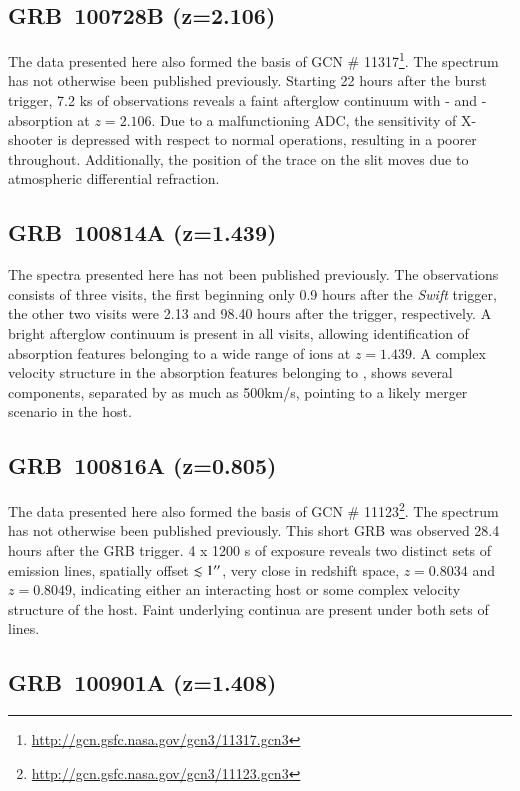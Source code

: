 \documentclass{aa}    %
\begin{document}
\subsection{GRB~100728B (z=2.106)}

The data presented here also formed the basis of GCN \#
11317\footnote{\url{http://gcn.gsfc.nasa.gov/gcn3/11317.gcn3}}. The spectrum has
not otherwise been published previously. Starting 22 hours after the burst
trigger, 7.2 ks of observations reveals a faint afterglow continuum with \lya-
and \mgii-absorption at $z=2.106$. Due to a malfunctioning ADC, the sensitivity
of X-shooter is depressed with respect to normal operations, resulting in a
poorer throughout. Additionally, the position of the trace on the slit moves due
to atmospheric differential refraction.

\subsection{GRB~100814A (z=1.439)}

The spectra presented here has not been published previously. The observations
consists of three visits, the first beginning only 0.9 hours after the
\textit{Swift} trigger, the other two visits were 2.13 and 98.40 hours after the
trigger, respectively. A bright afterglow continuum is present in all visits,
allowing identification of absorption features belonging to a wide range of ions
at $z=1.439$. A complex velocity structure in the absorption features belonging
to \mgii, shows several components, separated by as much as 500km/s, pointing to
a likely merger scenario in the host.

\subsection{GRB~100816A (z=0.805)}

The data presented here also formed the basis of GCN \#
11123\footnote{\url{http://gcn.gsfc.nasa.gov/gcn3/11123.gcn3}}. The spectrum has
not otherwise been published previously. This short GRB was observed 28.4 hours
after the GRB trigger. 4 x 1200 s of exposure reveals two distinct sets of
emission lines, spatially offset $\lesssim 1 ^{\prime\prime} $, very close in redshift
space, $z=0.8034$ and $z=0.8049$, indicating either an interacting host or some
complex velocity structure of the host. Faint underlying continua are present
under both sets of lines.

\subsection{GRB~100901A (z=1.408)}
\end{document}
